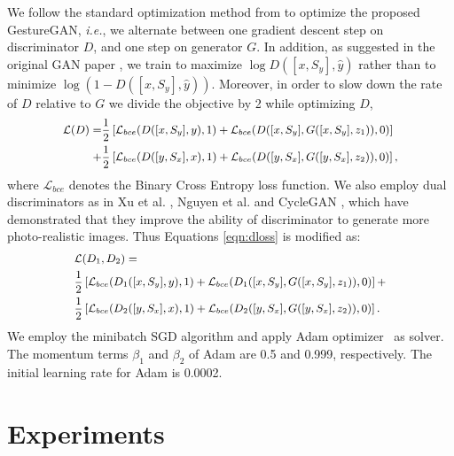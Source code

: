\documentclass[sigconf]{acmart}
\begin{document}
We follow the standard optimization method from \cite{goodfellow2014generative} to optimize the proposed GestureGAN, \textit{i.e.}, we alternate between one gradient descent step on discriminator $D$, and one step on generator $G$.
In addition, as suggested in the original GAN paper \cite{goodfellow2014generative}, we train to maximize $\log D([x, S_y], \widehat{y})$ rather than to minimize $\log (1 - D([x, S_y], \widehat{y}))$.
Moreover, in order to slow down the rate of $D$ relative to $G$ we divide the objective by 2 while optimizing $D$,
\vspace{-0.1cm}
\begin{equation} \small
\begin{aligned}
\mathcal{L}(D) = & 
\frac{1}{2}\left[\mathcal{L}_{bce}(D([x, S_y], y), 1) + \mathcal{L}_{bce}(D([x,S_y], G([x,S_y],z_1)), 0)\right] \\ + 
& \frac{1}{2}\left[\mathcal{L}_{bce}(D([y, S_x], x), 1) + \mathcal{L}_{bce}(D([y,S_x], G([y,S_x],z_2)), 0) \right],
\end{aligned}
\label{eqn:dloss}
\end{equation}
where $\mathcal{L}_{bce}$ denotes the Binary Cross Entropy loss function.
We also employ dual discriminators as in Xu et al. \cite{xu2017face}, Nguyen et al. \cite{nguyen2017dual} and CycleGAN \cite{zhu2017unpaired}, which have demonstrated that they improve the ability of discriminator to generate more photo-realistic images.
Thus Equations \ref{eqn:dloss} is modified as: 
\vspace{-0.1cm}
\begin{equation}\small
\begin{aligned}
& \mathcal{L}(D_1, D_2) =  \\ 
&\frac{1}{2}\left[\mathcal{L}_{bce}(D_1([x, S_y], y), 1) + \mathcal{L}_{bce}(D_1([x,S_y], G([x,S_y],z_1)), 0)\right] + \\
& \frac{1}{2}\left[\mathcal{L}_{bce}(D_2([y, S_x], x), 1) + \mathcal{L}_{bce}(D_2([y,S_x], G([y,S_x],z_2)), 0) \right].
\end{aligned}
\label{equ:double_d1}
\end{equation}
We employ the minibatch SGD algorithm and apply Adam optimizer~\cite{kingma2014adam} as solver. The momentum terms $\beta_1$ and  $\beta_2$ of Adam are 0.5 and 0.999, respectively.  
The initial learning rate for Adam is 0.0002.


\section{Experiments}
\label{sec:experiment}
\end{document}
